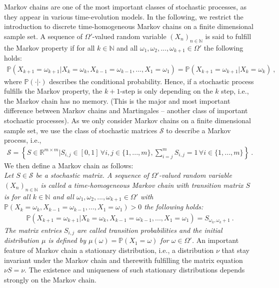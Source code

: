 \documentclass[11pt,a4paper]{article}
\numberwithin{equation}{section}
\begin{document}
%
Markov chains are one of the most important classes of stochastic processes, as they appear in various time-evolution models.
%
In the following, we restrict the introduction to discrete time-homogeneous Markov chains on a finite dimensional sample set. 
%
A sequence of $\Omega'$-valued random variable $(X_n)_{n\in\mathbb{N}}$ is said to fulfill the Markov property if for all $k\in\mathbb{N}$ and all $\omega_1,\omega_2,...,\omega_{k+1}\in \Omega'$ the following holds:
\begin{align*}
\mathbb{P}(X_{k+1}=\omega_{k+1}|X_{k}=\omega_{k},X_{k-1}=\omega_{k-1},...,X_{1}=\omega_{1})
=
\mathbb{P}(X_{k+1}=\omega_{k+1}|X_{k}=\omega_{k})~,
\end{align*}
where $\mathbb{P}(\cdot|\cdot)$ describes the conditional probability.
%
Hence, if a stochastic process fulfills the Markov property, the $k+1$-step is only depending on the $k$ step, i.e., the Markov chain has no memory.
%
(This is the major and most important difference between Markov chains and Martingales -- another class of important stochastic processes).
%
As we only consider Markov chains on a finite dimensional sample set, we use the class of stochastic matrices $\mathcal{S}$ to describe a Markov process, i.e., 
\begin{align*}
\mathcal{S} = \left\lbrace S\in \mathbb{R}^{m\times m} | S_{i,j}\in[0,1]\,\forall i,j\in\{1,...,m\}, \sum_{i=j}^mS_{i,j}=1\,\forall i\in\{1,...,m\} \right\rbrace~.
\end{align*}
We then define a Markov chain as follows:\\
\textit{
Let $S\in\mathcal{S}$ be a stochastic matrix. 
%
A sequence of $\Omega'$-valued random variable $(X_n)_{n\in\mathbb{N}}$ is called a time-homogeneous Markov chain with transition matrix $S$ is for all $k\in\mathbb{N}$ and all $\omega_1,\omega_2,...,\omega_{k+1}\in \Omega'$ with $\mathbb{P}(X_{k}=\omega_{k},X_{k-1}=\omega_{k-1},...,X_{1}=\omega_{1})>0$ the following holds:
\begin{align*}
\mathbb{P}(X_{k+1}=\omega_{k+1}|X_{k}=\omega_{k},X_{k-1}=\omega_{k-1},...,X_{1}=\omega_{1})
=S_{\omega_k,\omega_k+1}~.
\end{align*}
The matrix entries $S_{i,j}$ are called transition probabilities and the initial distribution $\mu$ is defined by $\mu(\omega)=\mathbb{P}(X_1=\omega)$ for $\omega\in\Omega'$.
}
An important feature of Markov chain a stationary distribution, i.e., a distribution $\nu$ that stay invariant under the Markov chain and therewith fulfilling the matrix equation $\nu S = \nu$. 
%
The existence and uniqueness of such stationary distributions depends strongly on the Markov chain. 
\end{document}
